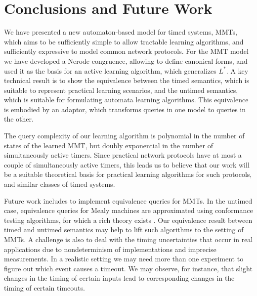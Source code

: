 \ifshort
\vspace{-1em}
\fi
\section{Conclusions and Future Work}
\label{conclusions}

We have presented a new automaton-based model for timed systems, MMTs,
which aims to
be sufficiently simple to allow tractable learning algorithms, and sufficiently
expressive to model common network protocols. For the MMT model we have
developed a Nerode congruence, allowing to define canonical forms, and used it
as the basis for an active learning algorithm, which generalizes $L^*$.
A key technical result is to show the equivalence between the timed semantics,
which is suitable to represent practical learning scenarios, and the
untimed semantics, which is suitable for formulating automata learning
algorithms. This equivalence is embodied by an adaptor, which transforms
queries in one model to queries in the other.

The query complexity of our learning algorithm is polynomial in the number of
states of the learned MMT, but doubly exponential in the number of simultaneously
active timers. Since practical network protocols have at most a couple of
simultaneously active timers, this leads us to believe that our work will
be a suitable theoretical basis for practical learning algorithms for such
protocols, and similar classes of timed systems.

Future work includes to implement equivalence queries for MMTs.
In the untimed case, equivalence queries for Mealy machines are approximated using conformance testing algorithms,
for which a rich theory exists \cite{LeeY96}.
Our equivalence result between timed and untimed semantics may help to
lift such algorithms to the setting of MMTs.
A challenge is also to deal with the timing uncertainties that occur in real applications due to nondeterminism of
implementations and imprecise measurements. In a realistic
setting we may need more than one experiment to figure out which event causes a timeout. We may observe, for instance,
that slight changes in the timing of certain inputs lead to corresponding changes in the timing of certain timeouts.

